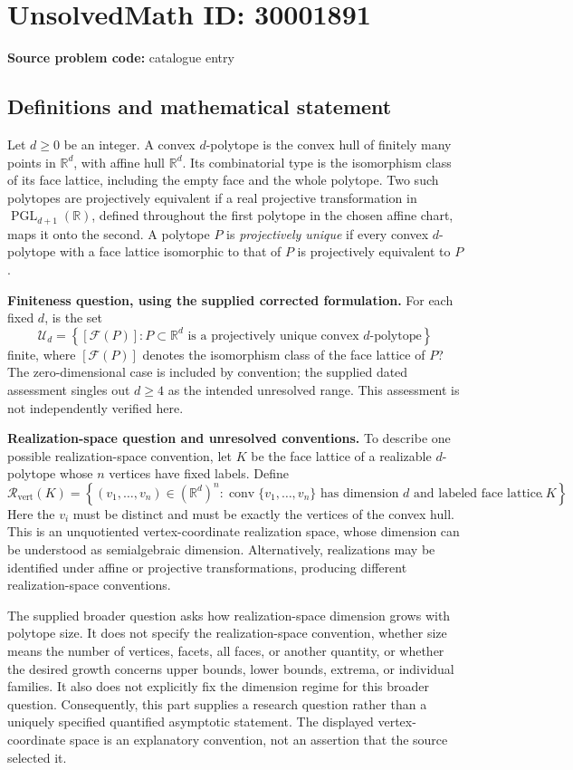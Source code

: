 \documentclass[11pt]{article}
\newcommand{\R}{\mathbb{R}}
\begin{document}
\section*{UnsolvedMath ID: 30001891}
\textbf{Source problem code:} catalogue entry
\subsection{Definitions and mathematical statement}
Let \(d\geq 0\) be an integer. A convex \(d\)-polytope is the convex hull of finitely many points in \(\R^d\), with affine hull \(\R^d\). Its combinatorial type is the isomorphism class of its face lattice, including the empty face and the whole polytope. Two such polytopes are projectively equivalent if a real projective transformation in \(\operatorname{PGL}_{d+1}(\R)\), defined throughout the first polytope in the chosen affine chart, maps it onto the second. A polytope \(P\) is \emph{projectively unique} if every convex \(d\)-polytope with a face lattice isomorphic to that of \(P\) is projectively equivalent to \(P\).

\textbf{Finiteness question, using the supplied corrected formulation.} For each fixed \(d\), is the set
\[
\mathcal U_d=\left\{[\mathcal F(P)] : P\subset\R^d\text{ is a projectively unique convex }d\text{-polytope}\right\}
\]
finite, where \([\mathcal F(P)]\) denotes the isomorphism class of the face lattice of \(P\)? The zero-dimensional case is included by convention; the supplied dated assessment singles out \(d\geq4\) as the intended unresolved range. This assessment is not independently verified here.

\textbf{Realization-space question and unresolved conventions.} To describe one possible realization-space convention, let \(K\) be the face lattice of a realizable \(d\)-polytope whose \(n\) vertices have fixed labels. Define
\[
\mathcal R_{\mathrm{vert}}(K)=\left\{(v_1,\ldots,v_n)\in(\R^d)^n : \operatorname{conv}\{v_1,\ldots,v_n\}\text{ has dimension }d\text{ and labeled face lattice }K\right\}.
\]
Here the \(v_i\) must be distinct and must be exactly the vertices of the convex hull. This is an unquotiented vertex-coordinate realization space, whose dimension can be understood as semialgebraic dimension. Alternatively, realizations may be identified under affine or projective transformations, producing different realization-space conventions.

The supplied broader question asks how realization-space dimension grows with polytope size. It does not specify the realization-space convention, whether size means the number of vertices, facets, all faces, or another quantity, or whether the desired growth concerns upper bounds, lower bounds, extrema, or individual families. It also does not explicitly fix the dimension regime for this broader question. Consequently, this part supplies a research question rather than a uniquely specified quantified asymptotic statement. The displayed vertex-coordinate space is an explanatory convention, not an assertion that the source selected it.
\end{document}
